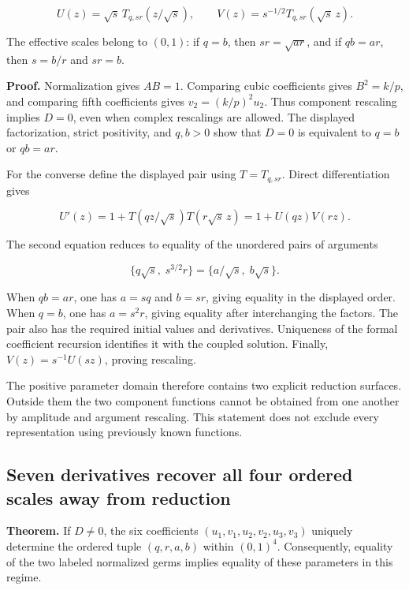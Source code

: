 \[
\boxed{
U(z)=\sqrt{s}\,T_{q,sr}(z/\sqrt{s}),\qquad
V(z)=s^{-1/2}T_{q,sr}(\sqrt{s}\,z).
}
\]

The effective scales belong to \((0,1)\): if \(q=b\), then
\(sr=\sqrt{ar}\), and if \(qb=ar\), then \(s=b/r\) and \(sr=b\).

\textbf{Proof.} Normalization gives \(AB=1\). Comparing cubic
coefficients gives \(B^2=k/p\), and comparing fifth coefficients gives
\(v_2=(k/p)^2u_2\). Thus component rescaling implies \(D=0\), even when
complex rescalings are allowed. The displayed factorization, strict
positivity, and \(q,b>0\) show that \(D=0\) is equivalent to \(q=b\) or
\(qb=ar\).

For the converse define the displayed pair using \(T=T_{q,sr}\). Direct
differentiation gives

\[
U'(z)=1+T(qz/\sqrt{s})T(r\sqrt{s}\,z)
=1+U(qz)V(rz).
\]

The second equation reduces to equality of the unordered pairs of
arguments

\[
\{q\sqrt{s},\;s^{3/2}r\}
=\{a/\sqrt{s},\;b\sqrt{s}\}.
\]

When \(qb=ar\), one has \(a=sq\) and \(b=sr\), giving equality in the
displayed order. When \(q=b\), one has \(a=s^2r\), giving equality after
interchanging the factors. The pair also has the required initial values
and derivatives. Uniqueness of the formal coefficient recursion
identifies it with the coupled solution. Finally, \(V(z)=s^{-1}U(sz)\),
proving rescaling.

The positive parameter domain therefore contains two explicit reduction
surfaces. Outside them the two component functions cannot be obtained
from one another by amplitude and argument rescaling. This statement
does not exclude every representation using previously known functions.

\hypertarget{v11-coupled_inverse_full-seven-derivatives-recover-all-four-ordered-scales-away-from-reduction}{%
\subsection{Seven derivatives recover all four ordered scales away
from
reduction}\label{v11-coupled_inverse_full-seven-derivatives-recover-all-four-ordered-scales-away-from-reduction}}

\textbf{Theorem.} If \(D\ne0\), the six coefficients
\((u_1,v_1,u_2,v_2,u_3,v_3)\) uniquely determine the ordered tuple
\((q,r,a,b)\) within \((0,1)^4\). Consequently, equality of the two
labeled normalized germs implies equality of these parameters in this
regime.

